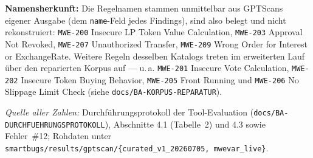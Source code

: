 \documentclass[11pt,a4paper]{scrartcl}
\newcommand{\code}[1]{\texttt{#1}}
\begin{document}
\noindent
\textbf{Namensherkunft:} Die Regelnamen stammen unmittelbar aus GPTScans eigener
Ausgabe (dem \code{name}-Feld jedes Findings), sind also belegt und nicht
rekonstruiert: \code{MWE-200} Insecure LP Token Value Calculation, \code{MWE-203}
Approval Not Revoked, \code{MWE-207} Unauthorized Transfer, \code{MWE-209} Wrong Order
for Interest or ExchangeRate. Weitere Regeln desselben Katalogs treten im erweiterten
Lauf über den reparierten Korpus auf --- u.\,a. \code{MWE-201} Insecure Vote
Calculation, \code{MWE-202} Insecure Token Buying Behavior, \code{MWE-205} Front
Running und \code{MWE-206} No Slippage Limit Check (siehe \code{docs/BA-KORPUS-REPARATUR}).

\bigskip
\noindent\emph{Quelle aller Zahlen:} Durchführungsprotokoll der Tool-Evaluation
(\code{docs/BA-DURCHFUEHRUNGSPROTOKOLL}), Abschnitte 4.1 (Tabelle~2) und 4.3 sowie
Fehler~\#12; Rohdaten unter
\code{smartbugs/results/gptscan/\{curated\_v1\_20260705, mwevar\_live\}}.
\end{document}
